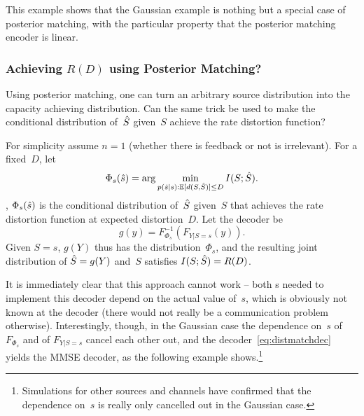 This example shows that the Gaussian example is nothing but a special case of
posterior matching, with the particular property that the posterior matching
encoder is linear.


\subsubsection{Achieving $R(D)$ using Posterior Matching?}

Using posterior matching,  one can turn an arbitrary source distribution into
the capacity achieving distribution. Can the same trick be used to make the
conditional distribution of~${\hat{S}}$ given~$S$ achieve the rate distortion
function? 

For simplicity assume $n = 1$ (whether there is feedback or not is irrelevant).
For a fixed~$D$, let
\begin{equation*}
  \Phi_s({\hat{s}}) = \arg\min_{p({\hat{s}}|s): \mathbb{E}[d(S,{\hat{S}})] \le D} I(S;{\hat{S}}).
\end{equation*}
\Ie, $\Phi_s({\hat{s}})$ is the conditional distribution of~${\hat{S}}$ given~$S$ that
achieves the rate distortion function at expected distortion~$D$. Let the
decoder be
\begin{equation}
  \label{eq:distmatchdec}
  g(y) = F_{\Phi_s}^{-1}(F_{Y|S=s}(y)).
\end{equation}
Given $S = s$, $g(Y)$ thus has the distribution~$\Phi_s$, and the resulting
joint distribution of ${\hat{S}} = g(Y)$ and~$S$ satisfies $I(S;{\hat{S}}) = R(D)$. 

It is immediately clear that this approach cannot work -- both \cdf s needed to
implement this decoder depend on the actual value of~$s$, which is obviously not
known at the decoder (there would not really be a communication problem
otherwise). Interestingly, though, in the Gaussian case the dependence on~$s$ of
$F_{\Phi_s}$ and of $F_{Y|S=s}$ cancel each other out, and the
decoder~\eqref{eq:distmatchdec} yields the MMSE decoder, as the following
example shows.\footnote{Simulations for other sources and channels have
confirmed that the dependence on~$s$ is really only cancelled out in the
Gaussian case.}

